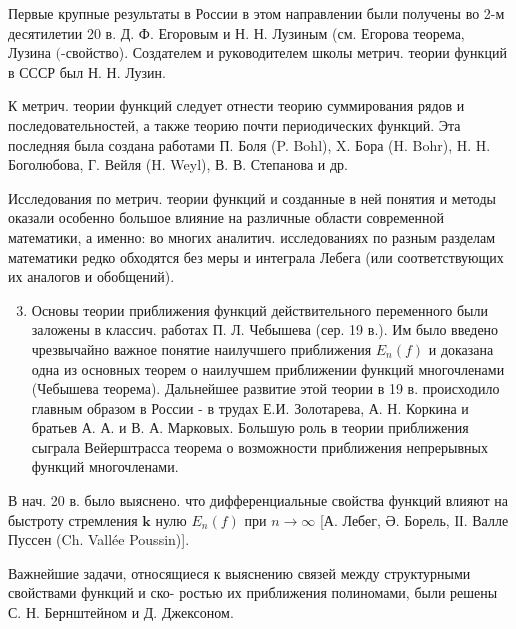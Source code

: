 \documentclass[10pt]{article}
\begin{document}
Первые крупные результаты в России в этом направлении были получены во 2-м десятилетии 20 в. Д. Ф. Егоровым и Н. Н. Лузиным (см. Егорова теорема, Лузина $($-свойство). Создателем и руководителем школы метрич. теории функций в СССР был Н. Н. Лузин.



К метрич. теории функций следует отнести теорию суммирования рядов и последовательностей, а также теорию почти периодических функций. Эта последняя была создана работами П. Боля (P. Bohl), X. Бора (H. Bohr), H. H. Боголюбова, Г. Вейля (H. Weyl), В. В. Степанова и др.



Исследования по метрич. теории функций и созданные в ней понятия и методы оказали особенно большое влияние на различные области современной математики, а именно: во многих аналитич. исследованиях по разным разделам математики редко обходятся без меры и интеграла Лебега (или соответствующих их аналогов и обобщений).



\begin{enumerate}

  \setcounter{enumi}{2}

  \item Основы теории приближения функций действительного переменного были заложены в классич. работах П. Л. Чебышева (сер. 19 в.). Им было введено чрезвычайно важное понятие наилучшего приближения $E_{n}(f)$ и доказана одна из основных теорем о наилучшем приближении функций многочленами (Чебышева теорема). Дальнейшее развитие этой теории в 19 в. происходило главным образом в России - в трудах Е.И. Золотарева, А. Н. Коркина и братьев А. А. и В. А. Марковых. Большую роль в теории приближения сыграла Вейерштрасса теорема о возможности приближения непрерывных функций многочленами.

\end{enumerate}



В нач. 20 в. было выяснено. что дифференциальные свойства функций влияют на быстроту стремления $\boldsymbol{k}$ нулю $E_{n}(f)$ при $n \rightarrow \infty$ [А. Лебег, Ә. Борель, ІІ. Валле Пуссен (Ch. Vallée Poussin)].



Важнейшие задачи, относящиеся к выяснению связей между структурными свойствами функций и ско- ростью их приближения полиномами, были решены С. Н. Бернштейном и Д. Джексоном.
\end{document}
